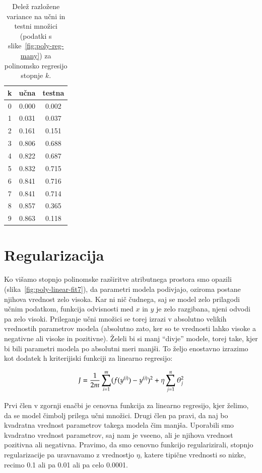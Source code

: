 \begin{table}
  \caption{Delež razložene variance na učni in testni množici (podatki s slike~\ref{fig:poly-reg-many}) za polinomsko regresijo stopnje $k$.}
  \begin{center}
  \begin{tabular}{ccc}
    \hline
    k & učna & testna \\
    \hline
    0 & 0.000 & 0.002 \\
    1 & 0.031 & 0.037 \\
    2 & 0.161 & 0.151 \\
    3 & 0.806 & 0.688 \\
    4 & 0.822 & 0.687 \\
    5 & 0.832 & 0.715 \\
    6 & 0.841 & 0.716 \\
    7 & 0.841 & 0.714 \\
    8 & 0.857 & 0.365 \\
    9 & 0.863 & 0.118 \\
    \hline
  \end{tabular}
  \end{center}
  \label{tab:poly-reg-many-res}
\end{table}

\section{Regularizacija}

Ko višamo stopnjo polinomske razširitve atributnega prostora smo opazili (slika~\ref{fig:poly-linear-fit7}), da parametri modela podivjajo, oziroma postane njihova vrednost zelo visoka. Kar ni nič čudnega, saj se model zelo prilagodi učnim podatkom, funkcija odvisnosti med $x$ in $y$ je zelo razgibana, njeni odvodi pa zelo visoki. Prileganje učni množici se torej izrazi v absolutno velikih vrednostih parametrov modela (absolutno zato, ker so te vrednosti lahko visoke a negativne ali visoke in pozitivne). Želeli bi si manj ``divje'' modele, torej take, kjer bi bili parametri modela po absolutni meri manjši. To željo enostavno izrazimo kot dodatek h kriterijiski funkciji za linearno regresijo:

\begin{equation}
J = {1\over 2m}\sum_{i=1}^m (f(y^{(i)})-y^{(i)})^2 + \eta\sum_{j=1}^n \theta_j^2
\end{equation}

Prvi člen v zgornji enačbi je cenovna funkcija za linearno regresijo, kjer želimo, da se model čimbolj prilega učni množici. Drugi člen pa pravi, da naj bo kvadratna vrednost parametrov takega modela čim manjša. Uporabili smo kvadratno vrednost parametrov, saj nam je vseeno, ali je njihova vrednost pozitivna ali negativna. Pravimo, da smo cenovno funkcijo regularizirali, stopnjo regularizacije pa uravnavamo z vrednostjo $\eta$, katere tipične vrednosti so nizke, recimo 0.1 ali pa 0.01 ali pa celo 0.0001.

